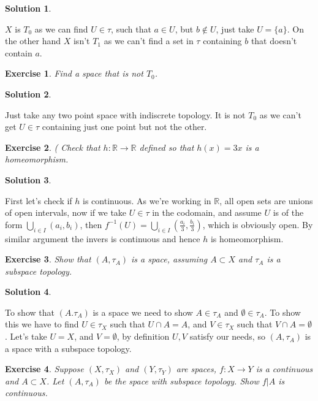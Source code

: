 \documentclass[11pt,a4paper]{article}
\newtheorem{Ex}{Exercise}
\newtheorem{Sol}{Solution}
\begin{document}
\begin{Sol} \end{Sol}
\noindent $X$ is $T_0$ as we can find $U \in \tau$, such that $a \in U$, but $b \not\in U$, just take $U = \{a\}$. On the other hand $X$ isn't $T_1$ as we can't find a set in $\tau$ containing $b$ that doesn't contain $a$. 

\begin{Ex}
	Find a space that is not $T_0$.
\end{Ex}

\begin{Sol} \end{Sol}
\noindent Just take any two point space with indiscrete topology. It is not $T_0$ as we can't get $U \in \tau$ containing just one point but not the other.

\begin{Ex}(
	Check that $h: \mathbb{R} \rightarrow \mathbb{R}$ defined so that $h(x) = 3x$ is a homeomorphism.
\end{Ex} 
\begin{Sol} \end{Sol}
\noindent First let's check if $h$ is continuous. As we're working in $\mathbb{R}$, all open sets are unions of open intervals, now if we take $U \in \tau$ in the codomain, and assume $U$ is of the form $\bigcup_{i \in I}(a_i, b_i)$, then $f^{-1}(U) = \bigcup_{i \in I}(\frac{a_i}{3}, \frac{b_i}{3})$, which is obviously open. By similar argument the invers is continuous and hence $h$ is homeomorphism. 

\begin{Ex}
	Show that $(A, \tau_A)$ is a space, assuming $A \subset X$ and $\tau_A$ is a subspace topology.
\end{Ex}

\begin{Sol} \end{Sol}
\noindent To show that $(A. \tau_A)$ is a space we need to show $A \in \tau_A$ and $\emptyset \in \tau_A$. To show this we have to find $U \in \tau_X$ such that $U \cap A = A$, and $V \in \tau_X$ such that $V \cap A = \emptyset$. Let's take $U = X$, and $V = \emptyset$, by definition $U,V$ satisfy our needs, so $(A , \tau_A)$ is a space with a subspace topology.

\begin{Ex}
	Suppose $(X, \tau_X)$ and $(Y, \tau_Y)$ are spaces, $f: X \rightarrow Y$ is a continuous and $A \subset X$. Let $(A, \tau_A)$ be the space with subspace topology. Show $f|A$ is continuous. 
\end{Ex}
\end{document}
